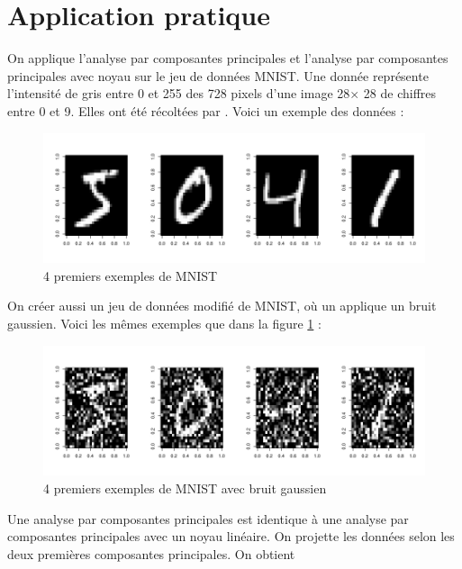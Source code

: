 \section{Application pratique}

On applique l'analyse par composantes principales et l'analyse par composantes principales avec noyau sur le jeu de données MNIST. Une donnée représente l'intensité de gris entre 0 et 255 des 728 pixels d'une image 28$\times$ 28 de chiffres entre 0 et 9. Elles ont été récoltées par \cite{lecun1998gradient}. Voici un exemple des données : 

\begin{figure}[H]
	\includegraphics[width=\textwidth]{digits-original}
	\caption{4 premiers exemples de MNIST}
	\label{fig:mnist-original}
\end{figure}

On créer aussi un jeu de données modifié de MNIST, où un applique un bruit gaussien. Voici les mêmes exemples que dans la figure \ref{fig:mnist-original} :

\begin{figure}[H]
	\includegraphics[width=\textwidth]{digits-noisy}
	\caption{4 premiers exemples de MNIST avec bruit gaussien}
\end{figure}

Une analyse par composantes principales est identique à une analyse par composantes principales avec un noyau linéaire. On projette les données selon les deux premières composantes principales. On obtient

